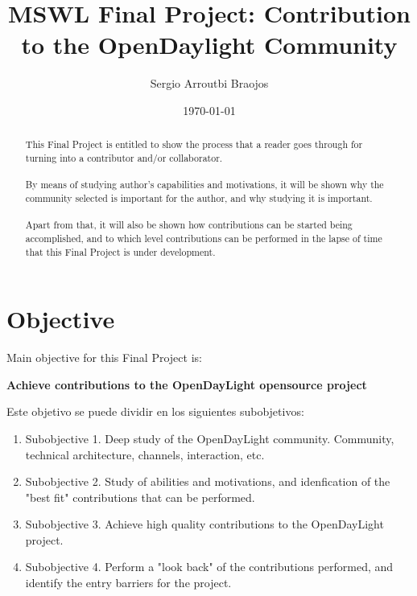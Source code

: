 \documentclass[10pt]{article}
\begin{document}
\title{MSWL Final Project: Contribution to the OpenDaylight Community}
\author{Sergio Arroutbi Braojos}
\date{\today}


\maketitle

\begin{abstract}

This Final Project is entitled to show the process that a reader goes through for turning into a contributor and/or collaborator.\\
\\
By means of studying author's capabilities and motivations, it will be shown why the community selected is important for the author, and why studying it is important.\\
\\
Apart from that, it will also be shown how contributions can be started being accomplished, and to which level contributions can be performed in the lapse of time that this Final Project is under development.

\end{abstract}

\section{Objective}

Main objective for this Final Project is:

\begin{center}
\bf{Achieve contributions to the OpenDayLight opensource project}
\end{center}

Este objetivo se puede dividir en los siguientes subobjetivos:

\begin{enumerate}
  \item Subobjective 1. Deep study of the OpenDayLight community. Community, technical architecture, channels, interaction, etc.
  \item Subobjective 2. Study of abilities and motivations, and idenfication of the "best fit" contributions that can be performed.
  \item Subobjective 3. Achieve high quality contributions to the OpenDayLight project.
  \item Subobjective 4. Perform a "look back" of the contributions performed, and identify the entry barriers for the project.
\end{enumerate}
\end{document}

